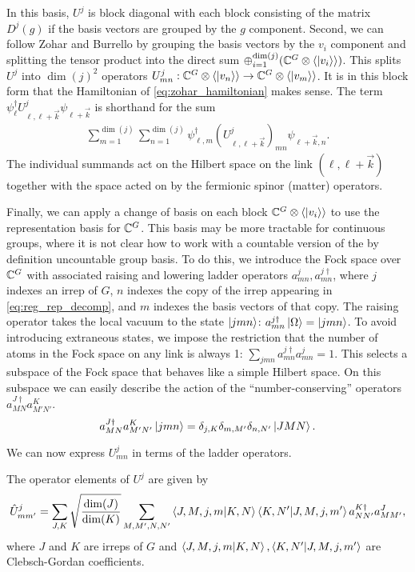 \documentclass[11pt,reqno]{amsart}
\numberwithin{equation}{section}
\begin{document}
	In this basis, $U^j$ is block diagonal with each block consisting of the matrix $D^j(g)$ if the basis vectors are grouped by the $g$ component. 
	Second, we can follow Zohar and Burrello by grouping the basis vectors by the $v_i$ component and splitting the tensor product into the direct sum $\oplus_{i=1}^{\dim(j)}(\mathbb{C}^G \otimes \langle \ket{v_i}\rangle)$.
	This splits $U^j$ into $\dim(j)^2$ operators $U^j_{mn}: \mathbb{C}^G \otimes \langle \ket{v_n}\rangle \to \mathbb{C}^G \otimes \langle \ket{v_m}\rangle$.
	It is in this block form that the Hamiltonian of \cref{eq:zohar_hamiltonian} makes sense. 
	The term $\psi^\dagger_\ell U^j_{\ell,\ell+\vec{k}} \psi_{\ell +\vec{k}}$ is shorthand for the sum
	\begin{align}
		\sum_{m=1}^{\dim(j)}\sum_{n=1}^{\dim(j)} \psi^\dagger_{\ell,m} (U^j_{\ell,\ell+\vec{k}})_{mn} \psi_{\ell +\vec{k},n}.
	\end{align}
	The individual summands act on the Hilbert space on the link $(\ell,\ell+\vec{k})$ together with the space acted on by the fermionic spinor (matter) operators.
	
	Finally, we can apply a change of basis on each block $\mathbb{C}^G \otimes \langle \ket{v_i}\rangle$ to use the representation basis for $\mathbb{C}^G$.
	This basis may be more tractable for continuous groups, where it is not clear how to work with a countable version of the by definition uncountable group basis. 
	To do this, we introduce the Fock space over $\mathbb{C}^G$ with associated raising and lowering ladder operators $a^j_{mn}, a^{j\dagger}_{mn}$, where $j$ indexes an irrep of $G$, $n$ indexes the copy of the irrep appearing in \cref{eq:reg_rep_decomp}, and $m$ indexes the basis vectors of that copy.
	The raising operator takes the local vacuum to the state $\ket{jmn}$: $a^{j\dagger}_{mn} \ket{\Omega} = \ket{jmn}$.
	To avoid introducing extraneous states, we impose the restriction that the number of atoms in the Fock space on any link is always 1: $\sum_{jmn} a^{j\dagger}_{mn} a^j_{mn} =1$.
	This selects a subspace of the Fock space that behaves like a simple Hilbert space.
	On this subspace we can easily describe the action of the ``number-conserving'' operators $a^{J\dagger}_{MN}a^{K}_{M'N'}$.
	\begin{equation}
		a^{J\dagger}_{MN}a^{K}_{M'N'}\ket{jmn} = \delta_{j,K}\delta_{m,M'}\delta_{n,N'}\ket{JMN}.
	\end{equation}
	
	We can now express $U^j_{mn}$ in terms of the ladder operators.
	\begin{proposition}\label{prop:Uj_ops}
		The operator elements of $U^j$ are given by
		\[\hat{U}^j_{mm'}= \sum_{J,K} \sqrt{\frac{\dim(J)}{\dim(K)}} \sum_{M,M',N,N'}\braket{J,M,j,m}{K,N} \braket{K, N'}{J,M,j,m'} a^{K\dagger}_{NN'} a^J_{MM'}, \]
		where $J$ and $K$ are irreps of $G$ and $\braket{J,M,j,m}{K,N}, \braket{K, N'}{J,M,j,m'}$ are Clebsch-Gordan coefficients.
	\end{proposition}
	
\end{document}
